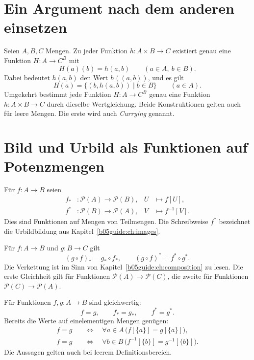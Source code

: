 \section{Ein Argument nach dem anderen einsetzen}

\begin{theorem}
\label{b05guide:thm:currying}
Seien $A,B,C$ Mengen. Zu jeder Funktion $h\colon A\times B\to C$
existiert genau eine Funktion $H\colon A\to C^B$ mit
\[
 H(a)(b)=h(a,b)\qquad(a\in A,\ b\in B).
\]
Dabei bedeutet $h(a,b)$ den Wert $h((a,b))$, und es gilt
\[
 H(a)=\{(b,h(a,b))\mid b\in B\}\qquad(a\in A).
\]
Umgekehrt bestimmt jede Funktion $H\colon A\to C^B$
genau eine Funktion $h\colon A\times B\to C$ durch dieselbe
Wertgleichung. Beide Konstruktionen gelten auch für leere Mengen.
Die erste wird auch \emph{Currying} genannt.
\end{theorem}

\section{Bild und Urbild als Funktionen auf Potenzmengen}

\begin{definition}
Für $f\colon A\to B$ seien
\[
 \begin{aligned}
 f_*&\colon\mathcal P(A)\to\mathcal P(B),
      &U&\mapsto f[U],\\
 f^*&\colon\mathcal P(B)\to\mathcal P(A),
      &V&\mapsto f^{-1}[V].
 \end{aligned}
\]
Dies sind Funktionen auf Mengen von Teilmengen.
Die Schreibweise $f^*$ bezeichnet die Urbildbildung aus
Kapitel~\ref{b05guide:ch:images}.
\end{definition}

\begin{theorem}
Für $f\colon A\to B$ und $g\colon B\to C$ gilt
\[
 (g\circ f)_*=g_*\circ f_*,
 \qquad
 (g\circ f)^*=f^*\circ g^*.
\]
Die Verkettung ist im Sinn von
Kapitel~\ref{b05guide:ch:composition} zu lesen.
Die erste Gleichheit gilt für Funktionen
$\mathcal P(A)\to\mathcal P(C)$, die zweite für Funktionen
$\mathcal P(C)\to\mathcal P(A)$.
\end{theorem}

\begin{theorem}
\label{b05guide:thm:operator-determination}
Für Funktionen $f,g\colon A\to B$ sind gleichwertig:
\[
 f=g,
 \qquad f_*=g_*,
 \qquad f^*=g^*.
\]
Bereits die Werte auf einelementigen Mengen genügen:
\[
 \begin{aligned}
 f=g
 &\quad\Longleftrightarrow\quad
    \forall a\in A\,\bigl(f[\{a\}]=g[\{a\}]\bigr),\\
 f=g
 &\quad\Longleftrightarrow\quad
    \forall b\in B\,
      \bigl(f^{-1}[\{b\}]=g^{-1}[\{b\}]\bigr).
 \end{aligned}
\]
Die Aussagen gelten auch bei leerem Definitionsbereich.
\end{theorem}

